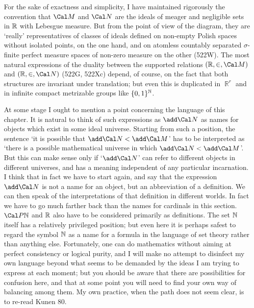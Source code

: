 {For the sake of exactness and simplicity, I have maintained rigorously
the convention that $\Cal M$ and $\Cal N$ are the ideals of meager and
negligible sets in $\Bbb R$ with Lebesgue measure.   But from the point
of view of the diagram, they are `really' representatives of
classes of ideals defined on non-empty Polish spaces without isolated
points, on the one hand, and on atomless countably separated
$\sigma$-finite perfect measure spaces of non-zero measure on the other
(522W).   The most natural expressions of the duality between the
supported relations $(\Bbb R,\in,\Cal M)$ and $(\Bbb R,\in,\Cal N)$
(522G, 522Xc) depend, of course, on the fact that both structures are
invariant under translation;  but even this is duplicated in $\BbbR^r$
and in infinite compact metrizable groups like $\{0,1\}^{\Bbb N}$.

At some stage I ought to mention a point concerning the language of this
chapter.   It is natural to think of such expressions as $\add\Cal N$ as
names for
objects which exist in some ideal universe.   Starting from such a
position, the sentence `it is possible that $\add\Cal N<\add\Cal M$' has
to be interpreted as
`there is a possible mathematical universe in which
$\add\Cal N<\add\Cal M$'.   But this can make sense only if
`$\add\Cal N$' can refer to different objects in
different universes, and has a meaning independent of any particular
incarnation.   I think that in fact we have to start again,
and say that the expression $\add\Cal N$ is not a name
for an object, but an abbreviation of a definition.   We can then speak
of the interpretations of that definition in different worlds.   In fact
we have to go much
farther back than the names for cardinals in this section.
$\Cal P\Bbb N$ and $\Bbb R$ also have to be considered primarily as
definitions.   The set $\Bbb N$
itself has a relatively privileged position;  but even here it is
perhaps safest to regard the symbol $\Bbb N$ as a name for a formula in
the language of set theory
rather than anything else.   Fortunately, one can do mathematics without
aiming at perfect consistency or logical purity, and I will make no
attempt to disinfect
my own language beyond what seems to be demanded by the ideas I am
trying to express at each moment;  but you should be aware that there
are possibilities for confusion here, and that at some point you will
need to find your own way of balancing among them.   My own practice,
when the path does not seem clear, is to re-read {\smc Kunen 80}.
}%

\discrpage

